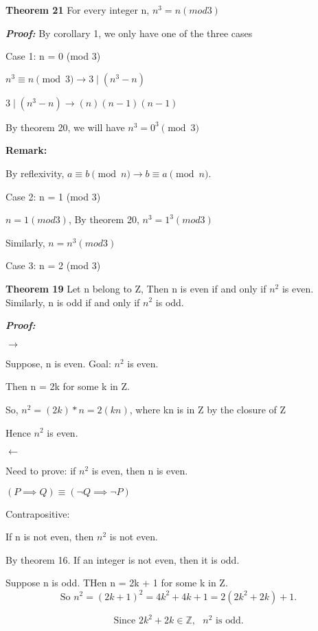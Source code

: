 \documentclass[12 pt]{article}        	%
\begin{document}
\textbf{Theorem 21}	
For every integer n, $n^3 = n (mod 3)$

\emph{\textbf{Proof:}} By corollary 1, we only have one of the three cases

Case 1: n = 0 (mod 3)

\begin{center}

$n^3 \equiv n \pmod{3} \longrightarrow  3 \mid (n^3 - n)$

$3 \mid (n^3 - n) \longrightarrow (n)(n - 1)(n - 1)$

By theorem 20, we will have $n^3 = 0^3 \pmod{3}$

\end{center}

\textbf{Remark:} 

By reflexivity, $a \equiv b \!\pmod{n} \longrightarrow b \equiv a \pmod{n}$.

Case 2: n = 1 (mod 3)

$n = 1 (mod 3)$, By theorem 20, $n^3 = 1^3 (mod 3)$

Similarly, $n = n^3(mod 3)$

Case 3: n = 2 (mod 3)

\newpage

\textbf{Theorem 19}	
Let n belong to Z, Then n is even if and only if $n^2$ is even. Similarly, n is odd if and only if $n^2$ is odd.

\emph{\textbf{Proof:}}

$\longrightarrow$

Suppose, n is even. Goal: $n^2$ is even.

Then n = 2k for some k in Z.

So, $n^2 = (2k) * n = 2(kn)$, where kn is in Z by the closure of Z

Hence $n^2$ is even.

$\longleftarrow$

Need to prove: if $n^2$ is even, then n is even.

$(P \implies Q) \equiv (\lnot Q \implies \lnot P)$

Contrapositive: 

If n is not even, then $n^2$ is not even.

By theorem 16. If an integer is not even, then it is odd.

Suppose n is odd. THen n = 2k + 1 for some k in Z.
\[
\text{So } n^2 = (2k + 1)^2 = 4k^2 + 4k + 1 = 2(2k^2 + 2k) + 1.
\]

\[
\text{Since } 2k^2 + 2k \in \mathbb{Z}, \text{ } n^2 \text{ is odd.}
\]
\end{document}
